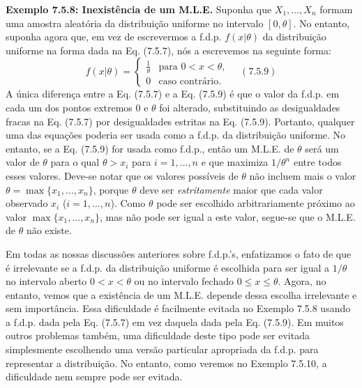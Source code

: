 \textbf{Exemplo 7.5.8: Inexistência de um M.L.E.} Suponha que $X_1, \dots, X_n$ formam uma amostra aleatória da distribuição uniforme no intervalo $[0, \theta]$. No entanto, suponha agora que, em vez de escrevermos a f.d.p. $f(x|\theta)$ da distribuição uniforme na forma dada na Eq. (7.5.7), nós a escrevemos na seguinte forma:
$$ f(x|\theta) = \begin{cases} \frac{1}{\theta} & \text{para } 0 < x < \theta, \\ 0 & \text{caso contrário}. \end{cases} \quad (7.5.9) $$
A única diferença entre a Eq. (7.5.7) e a Eq. (7.5.9) é que o valor da f.d.p. em cada um dos pontos extremos 0 e $\theta$ foi alterado, substituindo as desigualdades fracas na Eq. (7.5.7) por desigualdades estritas na Eq. (7.5.9). Portanto, qualquer uma das equações poderia ser usada como a f.d.p. da distribuição uniforme. No entanto, se a Eq. (7.5.9) for usada como f.d.p., então um M.L.E. de $\theta$ será um valor de $\theta$ para o qual $\theta > x_i$ para $i=1, \dots, n$ e que maximiza $1/\theta^n$ entre todos esses valores. Deve-se notar que os valores possíveis de $\theta$ não incluem mais o valor $\theta = \max\{x_1, \dots, x_n\}$, porque $\theta$ deve ser \textit{estritamente} maior que cada valor observado $x_i$ ($i=1, \dots, n$). Como $\theta$ pode ser escolhido arbitrariamente próximo ao valor $\max\{x_1, \dots, x_n\}$, mas não pode ser igual a este valor, segue-se que o M.L.E. de $\theta$ não existe.

\vspace{\baselineskip}

Em todas as nossas discussões anteriores sobre f.d.p.'s, enfatizamos o fato de que é irrelevante se a f.d.p. da distribuição uniforme é escolhida para ser igual a $1/\theta$ no intervalo aberto $0 < x < \theta$ ou no intervalo fechado $0 \le x \le \theta$. Agora, no entanto, vemos que a existência de um M.L.E. depende dessa escolha irrelevante e sem importância. Essa dificuldade é facilmente evitada no Exemplo 7.5.8 usando a f.d.p. dada pela Eq. (7.5.7) em vez daquela dada pela Eq. (7.5.9). Em muitos outros problemas também, uma dificuldade deste tipo pode ser evitada simplesmente escolhendo uma versão particular apropriada da f.d.p. para representar a distribuição. No entanto, como veremos no Exemplo 7.5.10, a dificuldade nem sempre pode ser evitada.

\vspace{\baselineskip}

